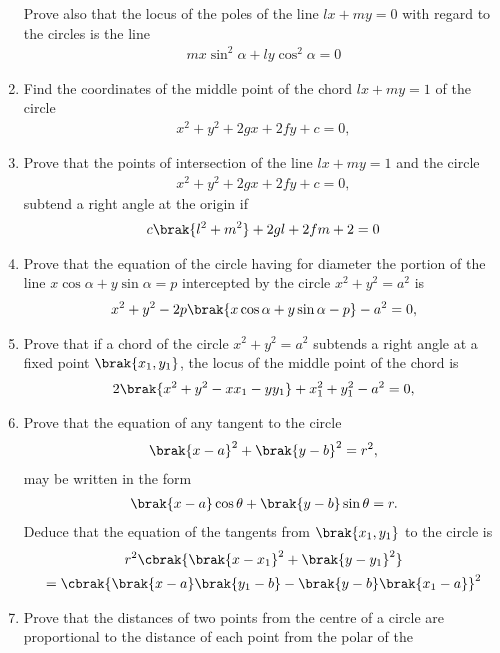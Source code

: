 \begin{enumerate}[1.]
Prove also that the locus of the poles of the line $lx+my=0$ with regard to the circles is the line
\begin{align*}
mx\sin^2\alpha+ly\cos^2\alpha = 0
\end{align*}
\item Find the coordinates of the middle point of the chord $lx+my=1$ of the circle
\begin{align*}
x^2 +y^2 +2gx+2f y+c =0,
\end{align*}
\item Prove that the points of intersection of the line $lx+my=1$ and the circle
\begin{align*}
x^2 +y^2 +2gx+2f y+c =0,
\end{align*}
subtend a right angle at the origin if
\begin{align*}
c\brak{l^2+m^2}+2gl+2fm+2=0
\end{align*}
\item Prove that the equation of the circle having for diameter the portion of the line $x\cos\alpha+y\sin\alpha = p$ intercepted by the circle $x^2 + y^2 =a^2$ is
\begin{align*}
x^2 +y^2 -2p\brak{x\cos\alpha+ y\sin\alpha-p} -a^2 =0,
\end{align*}
\item Prove that if a chord of the circle $x^2 + y^2 =a^2$ subtends a right angle at a fixed point $\brak{x_1,y_1}$, the locus of the middle point
of the chord is
\begin{align*}
2\brak{x^2+ y^2-xx_1-yy_1}+ x_1^2+ y_1^2 - a^2 =0,
\end{align*}
\item Prove that the equation of any tangent to the circle
\begin{align*}
\brak{x-a}^2+\brak{ y-b}^2 =r^2,
\end{align*}
may be written in the form
\begin{align*}
\brak{x-a}\cos\theta + \brak{y-b}\sin\theta =r.
\end{align*}
Deduce that the equation of the tangents from $\brak{x_1,y_1}$ to the circle is
\begin{multline*}
r^2\cbrak{\brak{x-x_1}^2+\brak{ y-y_1}^2} 
\\
 =\cbrak{\brak{x-a}\brak{y_1-b}-\brak{y-b}\brak{x_1-a} }^2
\end{multline*}
\item Prove that the distances of two points from the centre of a circle are proportional to the distance of each point from the polar of the

\end{enumerate}

